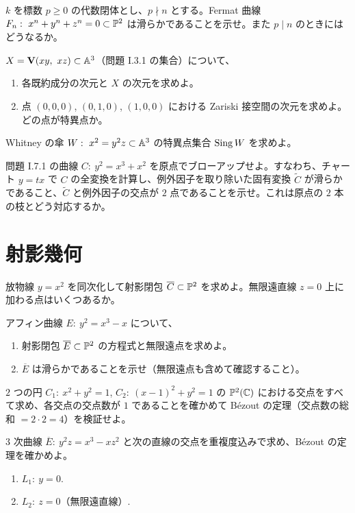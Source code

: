 $k$ を標数 $p\geq 0$ の代数閉体とし、$p\nmid n$ とする。Fermat 曲線 $F_n:\ x^n+y^n+z^n=0\subset\PP^2$ は滑らかであることを示せ。また $p\mid n$ のときにはどうなるか。

$X=\mathbf{V}(xy,\ xz)\subset\mathbb{A}^3$（問題 I.3.1 の集合）について、
\begin{enumerate}
  \item 各既約成分の次元と $X$ の次元を求めよ。
  \item 点 $(0,0,0)$, $(0,1,0)$, $(1,0,0)$ における Zariski 接空間の次元を求めよ。どの点が特異点か。
\end{enumerate}

Whitney の傘 $W:\ x^2=y^2z\subset\A^3$ の特異点集合 $\operatorname{Sing} W$ を求めよ。

問題 I.7.1 の曲線 $C:\ y^2=x^3+x^2$ を原点でブローアップせよ。すなわち、チャート $y=tx$ で $C$ の全変換を計算し、例外因子を取り除いた固有変換 $\widetilde{C}$ が滑らかであること、$\widetilde{C}$ と例外因子の交点が $2$ 点であることを示せ。これは原点の $2$ 本の枝とどう対応するか。

\section{射影幾何}

放物線 $y=x^2$ を同次化して射影閉包 $\overline{C}\subset\mathbb{P}^2$ を求めよ。無限遠直線 $z=0$ 上に加わる点はいくつあるか。

アフィン曲線 $E:\ y^2=x^3-x$ について、
\begin{enumerate}
  \item 射影閉包 $\overline{E}\subset\mathbb{P}^2$ の方程式と無限遠点を求めよ。
  \item $\overline{E}$ は滑らかであることを示せ（無限遠点も含めて確認すること）。
\end{enumerate}

$2$ つの円 $C_1:\ x^2+y^2=1$, $C_2:\ (x-1)^2+y^2=1$ の $\mathbb{P}^2(\mathbb{C})$ における交点をすべて求め、各交点の交点数が $1$ であることを確かめて Bézout の定理（交点数の総和 $=2\cdot 2=4$）を検証せよ。

$3$ 次曲線 $\overline{E}:\ y^2z=x^3-xz^2$ と次の直線の交点を重複度込みで求め、Bézout の定理を確かめよ。
\begin{enumerate}
  \item $L_1:\ y=0$.
  \item $L_2:\ z=0$（無限遠直線）.
\end{enumerate}

